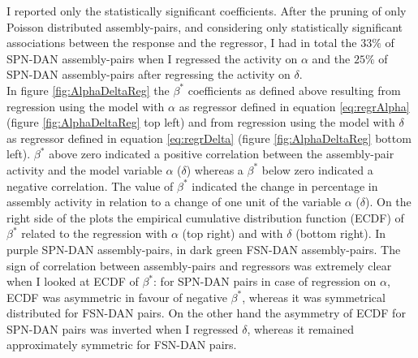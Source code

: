 I reported only the statistically significant coefficients. After the pruning of only Poisson distributed assembly-pairs, and considering only statistically significant associations between the response and the regressor, I had in total the $33\%$ of SPN-DAN assembly-pairs when I regressed the activity on $\alpha$ and the $25\%$ of SPN-DAN assembly-pairs after regressing the activity on $\delta$.\\In figure \ref{fig:AlphaDeltaReg} the $\beta^*$ coefficients as defined above resulting from regression using the model with $\alpha$ as regressor defined in equation \ref{eq:regrAlpha} (figure \ref{fig:AlphaDeltaReg} top left) and from regression using the model with $\delta$ as regressor defined in equation \ref{eq:regrDelta} (figure \ref{fig:AlphaDeltaReg} bottom left). $\beta^*$ above zero indicated a positive correlation between the assembly-pair activity and the model variable $\alpha$ ($\delta$) whereas a $\beta^*$ below zero indicated a negative correlation. The value of $\beta^*$ indicated the change in percentage in assembly activity in relation to a change of one unit of the variable $\alpha$ ($\delta$). On the right side of the plots the empirical cumulative distribution function (ECDF) of $\beta^*$ related to the regression with $\alpha$ (top right) and with $\delta$ (bottom right). In purple SPN-DAN assembly-pairs, in dark green FSN-DAN assembly-pairs. The sign of correlation between assembly-pairs and regressors was extremely clear when I looked at ECDF of $\beta^*$: for SPN-DAN pairs in case of regression on $\alpha$, ECDF was asymmetric in favour of negative $\beta^*$, whereas it was symmetrical distributed for FSN-DAN pairs. On the other hand the asymmetry of ECDF for SPN-DAN pairs was inverted when I regressed $\delta$, whereas it remained approximately symmetric for FSN-DAN pairs.
